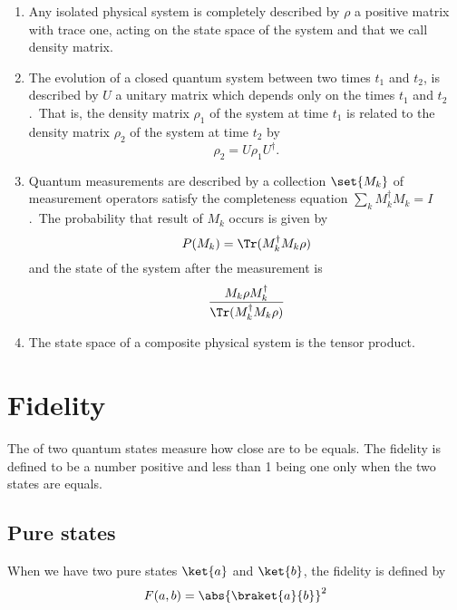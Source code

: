 \begin{enumerate}
    \item Any isolated physical system is completely described by $\rho$ a positive matrix with trace one, acting on the state space of the system and that we call density matrix.
    \item The evolution of a closed quantum system between two times $t_1$ and $t_2$, is described by $U$ a unitary matrix which depends only on the times $t_1$ and $t_2$.\ That is, the density matrix $\rho_1$ of the system at time $t_1$ is related to the density matrix $\rho_2$ of the system at time $t_2$ by
    \begin{equation}
        \label{eq:density-matrix-evolution}
        \rho_2 = U\rho_1 U^\dagger.
    \end{equation}
    \item Quantum measurements are described by a collection $\set{M_k}$ of measurement operators satisfy the completeness equation $\sum_{k}M_k^\dagger M_k = I$.\ The probability that result of $M_k$ occurs is given by
    \begin{equation}
        \label{eq:density-matrix-measure}
        P(M_k)=\Tr(M_k^\dagger M_k\rho)
    \end{equation}
    and the state of the system after the measurement is
    \begin{equation}
        \label{eq:density-matrix-measurent}
        \frac{M_k\rho M_k^\dagger}{\Tr(M_k^\dagger M_k\rho)}
    \end{equation}
    \item The state space of a composite physical system is the tensor product.
\end{enumerate}

\section{Fidelity}
The  of two quantum states measure how close are to be equals.
The fidelity is defined to be a number positive and less than 1 being one only when the two states are equals.

\subsection{Pure states}
When we have two pure states $\ket{a}$ and $\ket{b}$, the fidelity is defined by
\begin{equation}
    \label{eq:fidelity-pure}
    F(a, b)=\abs{\braket{a}{b}}^2
\end{equation}

